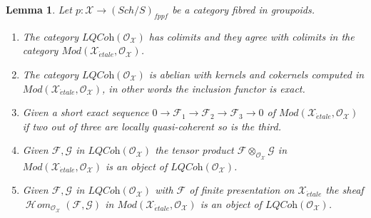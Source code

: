 \documentclass{stacks-project}
\theoremstyle{plain}
\newtheorem{lemma}[subsection]{Lemma}
\theoremstyle{definition}
\theoremstyle{remark}
\numberwithin{equation}{subsection}
\def\SheafHom{\mathop{\mathcal{H}\!\mathit{om}}\nolimits}
\def\Sch{\mathit{Sch}}
\def\etale{{\acute{e}tale}}
\begin{document}
\begin{lemma}
\label{lemma-lqc-colimits}
Let $p : \mathcal{X} \to (\Sch/S)_{fppf}$ be a category fibred in
groupoids.
\begin{enumerate}
\item The category $\textit{LQCoh}(\mathcal{O}_\mathcal{X})$
has colimits and they agree with colimits in the category
$\textit{Mod}(\mathcal{X}_\etale, \mathcal{O}_\mathcal{X})$.
\item The category $\textit{LQCoh}(\mathcal{O}_\mathcal{X})$
is abelian with kernels and cokernels computed in
$\textit{Mod}(\mathcal{X}_\etale, \mathcal{O}_\mathcal{X})$,
in other words the inclusion functor is exact.
\item Given a short exact sequence
$0 \to \mathcal{F}_1 \to \mathcal{F}_2 \to \mathcal{F}_3 \to 0$ of
$\textit{Mod}(\mathcal{X}_\etale, \mathcal{O}_\mathcal{X})$
if two out of three are locally quasi-coherent so is the third.
\item Given $\mathcal{F}, \mathcal{G}$ in
$\textit{LQCoh}(\mathcal{O}_\mathcal{X})$
the tensor product $\mathcal{F} \otimes_{\mathcal{O}_\mathcal{X}} \mathcal{G}$
in $\textit{Mod}(\mathcal{X}_\etale, \mathcal{O}_\mathcal{X})$
is an object of $\textit{LQCoh}(\mathcal{O}_\mathcal{X})$.
\item Given $\mathcal{F}, \mathcal{G}$ in
$\textit{LQCoh}(\mathcal{O}_\mathcal{X})$
with $\mathcal{F}$ of finite presentation on
$\mathcal{X}_\etale$ the sheaf
$\SheafHom_{\mathcal{O}_\mathcal{X}}(\mathcal{F}, \mathcal{G})$
in $\textit{Mod}(\mathcal{X}_\etale, \mathcal{O}_\mathcal{X})$
is an object of $\textit{LQCoh}(\mathcal{O}_\mathcal{X})$.
\end{enumerate}
\end{lemma}
\end{document}
